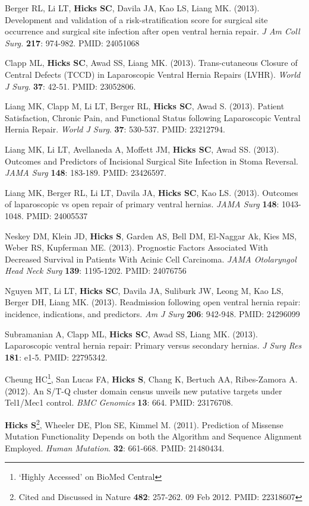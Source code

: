 \documentclass[10pt]{article}
\begin{document}
\begin{enumerate}[label= {[\arabic*]}, labelwidth=15pt]
\item Berger RL, Li LT, {\bf Hicks SC}, Davila JA, Kao LS, Liang MK. (2013). Development and validation of a risk-stratification score for surgical site occurrence and surgical site infection after open ventral hernia repair. {\it J Am Coll Surg.} {\bf 217}: 974-982. PMID: 24051068
\item Clapp ML, \textbf{Hicks SC}, Awad SS, Liang MK. (2013). Trans-cutaneous Closure of Central Defects (TCCD) in Laparoscopic Ventral Hernia Repairs (LVHR). {\it World J Surg}. {\bf 37}: 42-51. PMID: 23052806.
\item Liang MK, Clapp M, Li LT, Berger RL, {\bf Hicks SC}, Awad S. (2013). Patient Satisfaction, Chronic Pain, and Functional Status following Laparoscopic Ventral Hernia Repair. {\it World J Surg}. {\bf 37}: 530-537. PMID: 23212794. 
\item Liang MK, Li LT, Avellaneda A, Moffett JM, {\bf Hicks SC}, Awad SS. (2013). Outcomes and Predictors of Incisional Surgical Site Infection in Stoma Reversal. {\it JAMA Surg} {\bf 148}: 183-189. PMID: 23426597. 
\item Liang MK, Berger RL, Li LT, Davila JA, {\bf Hicks SC}, Kao LS. (2013). Outcomes of laparoscopic vs open repair of primary ventral hernias. {\it JAMA Surg} {\bf 148}: 1043-1048. PMID: 24005537 
\item Neskey DM, Klein JD, {\bf Hicks S}, Garden AS, Bell DM, El-Naggar Ak, Kies MS, Weber RS, Kupferman ME. (2013). Prognostic Factors Associated With Decreased Survival in Patients With Acinic Cell Carcinoma. {\it JAMA Otolaryngol Head Neck Surg} {\bf 139}: 1195-1202. PMID: 24076756
\item Nguyen MT, Li LT, {\bf Hicks SC}, Davila JA, Suliburk JW, Leong M, Kao LS, Berger DH, Liang MK. (2013). Readmission following open ventral hernia repair: incidence, indications, and predictors. {\it Am J Surg} {\bf 206}: 942-948. PMID: 24296099
\item Subramanian A, Clapp ML, {\bf Hicks SC}, Awad SS, Liang MK. (2013). Laparoscopic ventral hernia repair: Primary versus secondary hernias. {\it J Surg Res} {\bf 181}: e1-5. PMID: 22795342.
\item Cheung HC\footnote{ `Highly Accessed' on BioMed Central}, San Lucas FA, \textbf{Hicks S}, Chang K, Bertuch AA, Ribes-Zamora A. (2012). An S/T-Q cluster domain census unveils new putative targets under Tel1/Mec1 control. {\it BMC Genomics} {\bf 13}: 664. PMID: 23176708. 
\item \textbf{Hicks S}\footnote{Cited and Discussed in Nature {\bf 482}: 257-262. 09 Feb 2012. PMID: 22318607}, Wheeler DE, Plon SE, Kimmel M. (2011). Prediction of Missense Mutation Functionality Depends on both the Algorithm and Sequence Alignment Employed. {\it Human Mutation}. {\bf 32}: 661-668. PMID: 21480434.
\end{enumerate}
\end{document}
